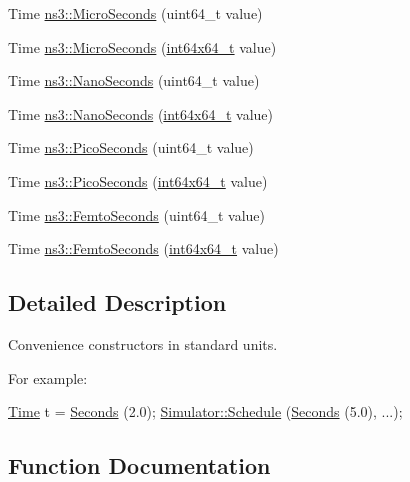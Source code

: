\begin{DoxyCompactItemize}
Time \hyperlink{group__timecivil_ga17465a639c8d1464e76538afdd78a9f0}{ns3\+::\+Micro\+Seconds} (uint64\+\_\+t value)
\item 
Time \hyperlink{group__timecivil_gaefa3fed7390aaefecbd786061349422f}{ns3\+::\+Micro\+Seconds} (\hyperlink{classint64x64__t}{int64x64\+\_\+t} value)
\item 
Time \hyperlink{group__timecivil_ga281d64bcb4dad96267d83c7688ec433f}{ns3\+::\+Nano\+Seconds} (uint64\+\_\+t value)
\item 
Time \hyperlink{group__timecivil_gac97e03612b1423b981d8675a2eba95f8}{ns3\+::\+Nano\+Seconds} (\hyperlink{classint64x64__t}{int64x64\+\_\+t} value)
\item 
Time \hyperlink{group__timecivil_ga76fd2414c43c694447c6e290954c9f3a}{ns3\+::\+Pico\+Seconds} (uint64\+\_\+t value)
\item 
Time \hyperlink{group__timecivil_ga5187d3b8cb7ceccc0d492fe93a206aa8}{ns3\+::\+Pico\+Seconds} (\hyperlink{classint64x64__t}{int64x64\+\_\+t} value)
\item 
Time \hyperlink{group__timecivil_ga7df0af9e3ea0a71baeba0fbde1c54943}{ns3\+::\+Femto\+Seconds} (uint64\+\_\+t value)
\item 
Time \hyperlink{group__timecivil_gac5e0f0ac4f64b42a73364a839379ead9}{ns3\+::\+Femto\+Seconds} (\hyperlink{classint64x64__t}{int64x64\+\_\+t} value)
\end{DoxyCompactItemize}


\subsection{Detailed Description}
Convenience constructors in standard units. 

For example\+: 
\begin{DoxyCode}
\hyperlink{namespacens3_1_1TracedValueCallback_a7ffd3e7c142ffe7c8a1d2db9b8de38ec}{Time} t = \hyperlink{group__timecivil_ga33c34b816f8ff6628e33d5c8e9713b9e}{Seconds} (2.0);
\hyperlink{classns3_1_1Simulator_a671882c894a08af4a5e91181bf1eec13}{Simulator::Schedule} (\hyperlink{group__timecivil_ga33c34b816f8ff6628e33d5c8e9713b9e}{Seconds} (5.0), ...);
\end{DoxyCode}
 

\subsection{Function Documentation}
